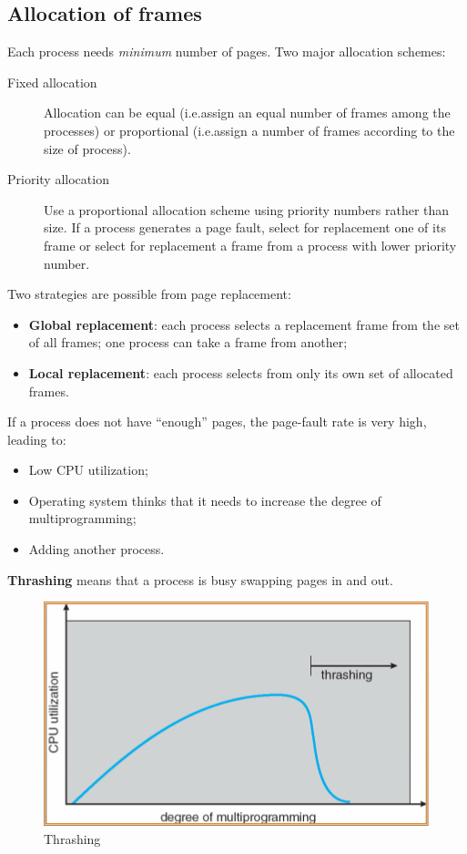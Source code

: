 \subsection{Allocation of frames}
Each process needs \emph{minimum} number of pages. Two major allocation schemes:
\begin{description}
\item [Fixed allocation] Allocation can be equal (i.e.\@ assign an equal number of frames among the processes) or proportional (i.e.\@ assign a number of frames according to the size of process).
\item [Priority allocation] Use a proportional allocation scheme using priority numbers rather than size. If a process generates a page fault, select for replacement one of its frame or select for replacement a frame from a process with lower priority number.
\end{description}
Two strategies are possible from page replacement:
\begin{itemize}
\item \textbf{Global replacement}: each process selects a replacement frame from the set of all frames; one process can take a frame from another;
\item \textbf{Local replacement}: each process selects from only its own set of allocated frames.
\end{itemize}
If a process does not have ``enough'' pages, the page-fault rate is very high, leading to:
\begin{itemize}
\item Low CPU utilization;
\item Operating system thinks that it needs to increase the degree of multiprogramming;
\item Adding another process.
\end{itemize}
\textbf{Thrashing} means that a process is busy swapping pages in and out.

\begin{figure}[hbtp]
\centering
\includegraphics[scale=0.4]{images/virtual_memory/thrashing.jpg}
\caption{Thrashing}
\end{figure}

